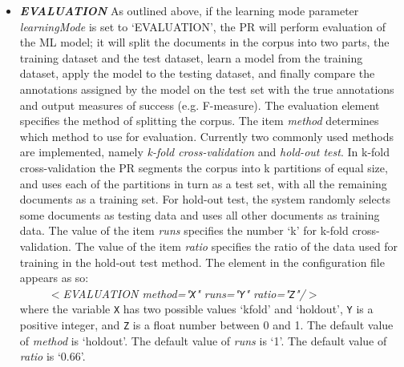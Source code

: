\begin{itemize}
\item {\em {\bf EVALUATION}} As outlined above, if the learning mode parameter
  {\em learningMode} is set to `EVALUATION', the PR will perform evaluation of
  the ML model; it will split the documents in the corpus into two parts, the
  training dataset and the test dataset, learn a model from the training
  dataset, apply the model to the testing dataset, and finally compare the
  annotations assigned by the model on the test set with the true annotations
  and output measures of success (e.g. F-measure). The evaluation element
  specifies the method of splitting the corpus. The item {\em method}
  determines which method to use for evaluation. Currently two commonly used
  methods are implemented, namely {\em k-fold cross-validation} and {\em
    hold-out test}. In k-fold cross-validation the PR segments the corpus into
  k partitions of equal size, and uses each of the partitions in turn as a
  test set, with all the remaining documents as a training set. For hold-out
  test, the system randomly selects some documents as testing data and uses
  all other documents as training data. The value of the item {\em runs}
  specifies the number `k' for k-fold cross-validation. The value of the item
  {\em ratio} specifies the ratio of the data used for training in the
  hold-out test method. The
  element in the configuration file appears as so:\\
  \ \ \ \ \ {\em $<$EVALUATION method="\texttt{X}" runs="\texttt{Y}" ratio="\texttt{Z}"/$>$}\\
  where the variable \texttt{X} has two possible values `kfold' and `holdout',
  \texttt{Y} is a positive integer, and \texttt{Z} is a float number between 0
  and 1. The default value of {\em method} is `holdout'. The default value of
  {\em runs} is `1'. The default value of {\em ratio} is `0.66'.


\end{itemize}
